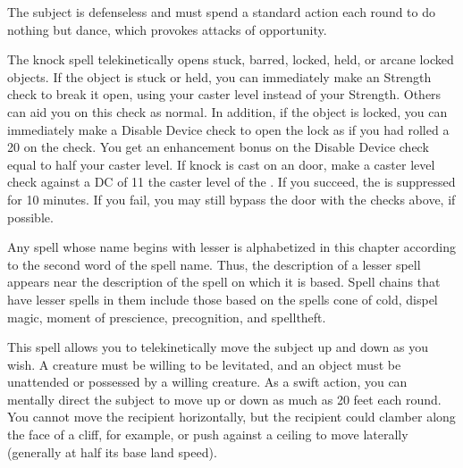 \spelleffect The subject is defenseless and must spend a standard action each round to do nothing but dance, which provokes attacks of opportunity.

\begin{comment}
\subsubsection{J-L}
\end{comment}

\spelleffect The knock spell telekinetically opens stuck, barred, locked, held, or arcane locked objects. If the object is stuck or held, you can immediately make an Strength check to break it open, using your caster level instead of your Strength. Others can aid you on this check as normal. In addition, if the object is locked, you can immediately make a Disable Device check to open the lock as if you had rolled a 20 on the check. You get an enhancement bonus on the Disable Device check equal to half your caster level.
\spellnotes If knock is cast on an  door, make a caster level check against a DC of 11 \add the caster level of the . If you succeed, the  is suppressed for 10 minutes. If you fail, you may still bypass the door with the checks above, if possible.

\par Any spell whose name begins with lesser is alphabetized in this chapter according to the second word of the spell name. Thus, the description of a lesser spell appears near the description of the spell on which it is based. Spell chains that have lesser spells in them include those based on the spells cone of cold, dispel magic, moment of prescience, precognition, and spelltheft.

\spelldur{\durshort \dismissable}
\spelleffect This spell allows you to telekinetically move the subject up and down as you wish. A creature must be willing to be levitated, and an object must be unattended or possessed by a willing creature. As a swift action, you can mentally direct the subject to move up or down as much as 20 feet each round. You cannot move the recipient horizontally, but the recipient could clamber along the face of a cliff, for example, or push against a ceiling to move laterally (generally at half its base land speed).

